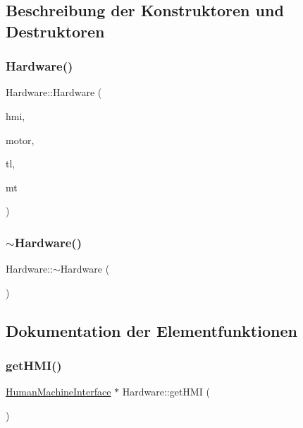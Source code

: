 \subsection{Beschreibung der Konstruktoren und Destruktoren}
\hypertarget{class_hardware_a554fd479b788d6d73473aceb117f17d8}{}\label{class_hardware_a554fd479b788d6d73473aceb117f17d8} 
\subsubsection{\texorpdfstring{Hardware()}{Hardware()}}
{\footnotesize\ttfamily Hardware\+::\+Hardware (\begin{DoxyParamCaption}\item[{\hyperlink{class_human_machine_interface}{Human\+Machine\+Interface} $\ast$}]{hmi,  }\item[{\hyperlink{class_motor}{Motor} $\ast$}]{motor,  }\item[{\hyperlink{class_traffic_light}{Traffic\+Light} $\ast$}]{tl,  }\item[{\hyperlink{class_measuring_tool}{Measuring\+Tool} $\ast$}]{mt }\end{DoxyParamCaption})}

\hypertarget{class_hardware_a92901a44130552d28485409bcf6906f5}{}\label{class_hardware_a92901a44130552d28485409bcf6906f5} 
\subsubsection{\texorpdfstring{$\sim$\+Hardware()}{~Hardware()}}
{\footnotesize\ttfamily Hardware\+::$\sim$\+Hardware (\begin{DoxyParamCaption}{ }\end{DoxyParamCaption})}



\subsection{Dokumentation der Elementfunktionen}
\hypertarget{class_hardware_aec8f013270ef5d6e79afed214b5c18cf}{}\label{class_hardware_aec8f013270ef5d6e79afed214b5c18cf} 
\subsubsection{\texorpdfstring{get\+H\+M\+I()}{getHMI()}}
{\footnotesize\ttfamily \hyperlink{class_human_machine_interface}{Human\+Machine\+Interface} $\ast$ Hardware\+::get\+H\+MI (\begin{DoxyParamCaption}{ }\end{DoxyParamCaption})}

